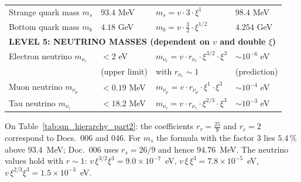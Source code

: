 \begin{table}[htbp]
{\begin{tabular}{p{3.8cm}p{2.5cm}p{3.5cm}p{2.8cm}}
	Strange quark mass $m_s$ & $93.4$ MeV & $m_s = v \cdot 3 \cdot \xi^1$ & $98.4$ MeV \\
	
	Bottom quark mass $m_b$ & $4.18$ GeV & $m_b = v \cdot \frac{3}{2} \cdot \xi^{1/2}$ & $4.254$ GeV \\
	
	\midrule
	\multicolumn{4}{l}{\textbf{LEVEL 5: NEUTRINO MASSES (dependent on $v$ and double $\xi$)}} \\
	\midrule
	
	Electron neutrino $m_{\nu_e}$ & $< 2$ eV & $m_{\nu_e} = v \cdot r_{\nu_e} \cdot \xi^{3/2} \cdot \xi^3$ & $\sim 10^{-6}$ eV \\
	& (upper limit) & with $r_{\nu_e} \sim 1$ & (prediction) \\[0.3em]
	
	Muon neutrino $m_{\nu_\mu}$ & $< 0.19$ MeV & $m_{\nu_\mu} = v \cdot r_{\nu_\mu} \cdot \xi^{1} \cdot \xi^3$ & $\sim 10^{-4}$ eV \\
	
	Tau neutrino $m_{\nu_\tau}$ & $< 18.2$ MeV & $m_{\nu_\tau} = v \cdot r_{\nu_\tau} \cdot \xi^{2/3} \cdot \xi^3$ & $\sim 10^{-3}$ eV \\
	
\end{tabular}%
}
\end{table}
On Table~\ref{tab:sm_hierarchy_part2}: the coefficients $r_\tau = \frac{25}{9}$ and $r_c = 2$ correspond to Docs.~006 and 046. For $m_s$ the formula with the factor $3$ lies $5.4\,\%$ above $93.4$~MeV; Doc.~006 uses $r_s = 26/9$ and hence $94.76$~MeV. The neutrino values hold with $r \sim 1$: $v\,\xi^{3/2}\xi^3 = 9.0\times10^{-7}$~eV, $v\,\xi\,\xi^3 = 7.8\times10^{-5}$~eV, $v\,\xi^{2/3}\xi^3 = 1.5\times10^{-3}$~eV.

